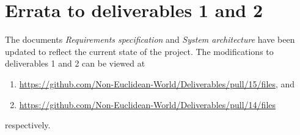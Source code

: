 \section{Errata to deliverables 1 and 2}
The documents \textit{Requirements specification} and \textit{System architecture} have been updated to reflect the current state of the project.
The modifications to deliverables 1 and 2 can be viewed at
\begin{enumerate}
    \item  \url{https://github.com/Non-Euclidean-World/Deliverables/pull/15/files}, and
    \item \url{https://github.com/Non-Euclidean-World/Deliverables/pull/14/files}
\end{enumerate}
respectively.